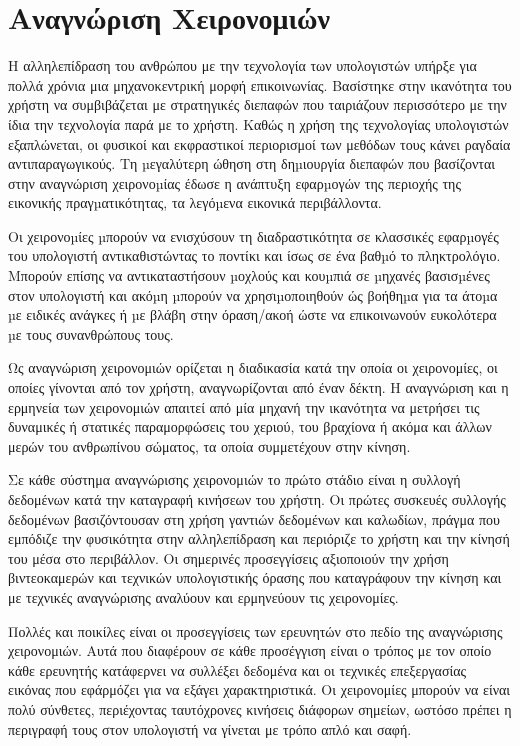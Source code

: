 \section{Αναγνώριση Χειρονομιών}


Η αλληλεπίδραση του ανθρώπου με την τεχνολογία των υπολογιστών υπήρξε για πολλά χρόνια μια μηχανοκεντρική μορφή επικοινωνίας. Βασίστηκε στην ικανότητα του χρήστη να συμβιβάζεται με στρατηγικές διεπαφών που ταιριάζουν περισσότερο με την ίδια την τεχνολογία παρά με το χρήστη. Καθώς η χρήση της τεχνολογίας υπολογιστών εξαπλώνεται, οι φυσικοί και εκφραστικοί περιορισμοί των μεθόδων τους κάνει ραγδαία αντιπαραγωγικούς. Τη µεγαλύτερη ώθηση στη δηµιουργία διεπαφών που βασίζονται στην αναγνώριση χειρονοµίας έδωσε η ανάπτυξη εφαρµογών της περιοχής της εικονικής πραγµατικότητας, τα λεγόµενα εικονικά περιβάλλοντα. 


Οι χειρονοµίες µπορούν να ενισχύσουν τη διαδραστικότητα σε κλασσικές εφαρµογές του υπολογιστή αντικαθιστώντας το ποντίκι και ίσως σε ένα βαθµό το πληκτρολόγιο. Μπορούν επίσης να αντικαταστήσουν µοχλούς και κουµπιά σε µηχανές βασισµένες στον υπολογιστή και ακόµη µπορούν να χρησιµοποιηθούν ώς βοήθηµα για τα άτοµα µε ειδικές ανάγκες ή µε βλάβη στην όραση/ακοή ώστε να επικοινωνούν ευκολότερα µε τους συνανθρώπους τους. 


Ως αναγνώριση χειρονομιών ορίζεται η διαδικασία κατά την οποία οι χειρονομίες, οι οποίες γίνονται από τον χρήστη, αναγνωρίζονται από έναν δέκτη. Η αναγνώριση και η ερμηνεία των χειρονομιών απαιτεί από μία μηχανή την ικανότητα να μετρήσει τις δυναμικές ή στατικές παραμορφώσεις του χεριού, του βραχίονα ή ακόμα και άλλων μερών του ανθρωπίνου σώματος, τα οποία συμμετέχουν στην κίνηση.

Σε κάθε σύστημα αναγνώρισης χειρονομιών το πρώτο στάδιο είναι η συλλογή δεδομένων κατά την καταγραφή κινήσεων του χρήστη. Οι πρώτες συσκευές συλλογής δεδομένων βασιζόντουσαν στη χρήση γαντιών δεδομένων και καλωδίων, πράγμα που εμπόδιζε την φυσικότητα στην αλληλεπίδραση και περιόριζε το χρήστη και την κίνησή του μέσα στο περιβάλλον. Οι σημερινές προσεγγίσεις αξιοποιούν την χρήση βιντεοκαμερών και τεχνικών υπολογιστικής όρασης που καταγράφουν την κίνηση και με τεχνικές αναγνώρισης αναλύουν και ερμηνεύουν τις χειρονομίες.


Πολλές και ποικίλες είναι οι προσεγγίσεις των ερευνητών στο πεδίο της αναγνώρισης χειρονομιών. Αυτά που διαφέρουν σε κάθε προσέγγιση είναι ο τρόπος με τον οποίο κάθε ερευνητής κατάφερνει να συλλέξει δεδομένα και οι τεχνικές επεξεργασίας εικόνας που εφάρμόζει για να εξάγει χαρακτηριστικά. 
Οι χειρονομίες μπορούν να είναι πολύ σύνθετες, περιέχοντας ταυτόχρονες κινήσεις διάφορων σημείων, ωστόσο πρέπει η περιγραφή τους στον υπολογιστή να γίνεται με τρόπο απλό και σαφή.



